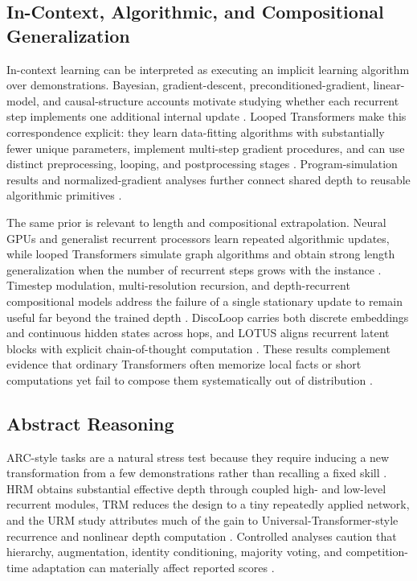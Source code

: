\subsection{In-Context, Algorithmic, and Compositional Generalization}

In-context learning can be interpreted as executing an implicit learning algorithm over demonstrations. Bayesian, gradient-descent, preconditioned-gradient, linear-model, and causal-structure accounts motivate studying whether each recurrent step implements one additional internal update \citep{xie2022explanation,akyurek2023learning,vonoswald2023transformers,ahn2023transformers,li2023algorithms,zhang2023trained,nichani2024causal}. Looped Transformers make this correspondence explicit: they learn data-fitting algorithms with substantially fewer unique parameters, implement multi-step gradient procedures, and can use distinct preprocessing, looping, and postprocessing stages \citep{yang2023looped,gatmiry2024can,chen2025bypassing,gao2025algoformer}. Program-simulation results and normalized-gradient analyses further connect shared depth to reusable algorithmic primitives \citep{giannou2023looped}.

The same prior is relevant to length and compositional extrapolation. Neural GPUs and generalist recurrent processors learn repeated algorithmic updates, while looped Transformers simulate graph algorithms and obtain strong length generalization when the number of recurrent steps grows with the instance \citep{kaiser2016neural,backdeluca2024simulation,fan2024looped}. Timestep modulation, multi-resolution recursion, and depth-recurrent compositional models address the failure of a single stationary update to remain useful far beyond the trained depth \citep{xu2025expressive,yu2026spiralformer,chen2026thinking}. DiscoLoop carries both discrete embeddings and continuous hidden states across hops, and LOTUS aligns recurrent latent blocks with explicit chain-of-thought computation \citep{fu2026discoloop,fan2026lotus}. These results complement evidence that ordinary Transformers often memorize local facts or short computations yet fail to compose them systematically out of distribution \citep{biran2024hopping,yao2025implicit,dziri2023faith}.

\subsection{Abstract Reasoning}

ARC-style tasks are a natural stress test because they require inducing a new transformation from a few demonstrations rather than recalling a fixed skill \citep{chollet2019measure,chollet2025arcagi2}. HRM obtains substantial effective depth through coupled high- and low-level recurrent modules, TRM reduces the design to a tiny repeatedly applied network, and the URM study attributes much of the gain to Universal-Transformer-style recurrence and nonlinear depth computation \citep{wang2025hierarchical,jolicoeurmartineau2025trm,gao2025universal}. Controlled analyses caution that hierarchy, augmentation, identity conditioning, majority voting, and competition-time adaptation can materially affect reported scores \citep{ge2025hrmperspectives,ren2026reasoningguessing,royeazar2025trm,mcgovern2025testtime}.

